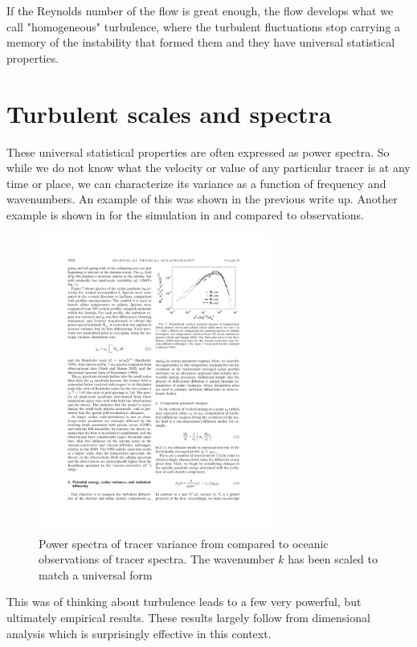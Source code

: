 \documentclass[11pt]{article}
\begin{document}
If the Reynolds number of the flow is great enough, the flow develops what we
call "homogeneous" turbulence, where the turbulent fluctuations stop carrying a
memory of the instability that formed them and they have universal statistical
properties.  

\section{Turbulent scales and spectra}

These universal statistical properties are often expressed as power spectra. 
So while we do not know what the velocity or value of any particular tracer is
at any time or place, we can characterize its variance as a function of
frequency and wavenumbers.  An example of this was shown in the previous write
up.   Another example is shown in  for the simulation
in  and compared to observations.  

\begin{figure}[hbtp]
  \begin{center}\includegraphics[width=3in]{images/SmythMoum05Fig7.pdf}
    \caption{Power spectra of tracer variance from \citep{smythetal05} compared
to oceanic observations of tracer spectra. The wavenumber $k$ has been scaled
to match a universal form}
    \label{fig:SmythMoum05Fig7}
  \end{center}
\end{figure}

This was of thinking about turbulence leads to a few very powerful, but
ultimately empirical results.  These results largely follow from dimensional
analysis which is surprisingly effective in this context.
\end{document}

